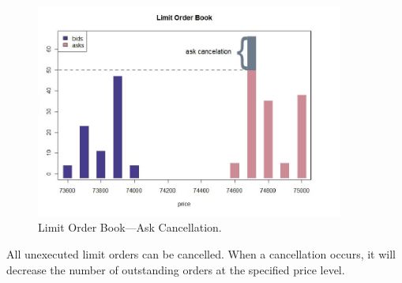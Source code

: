 	\begin{figure}[!ht]
	   \centering
	   \includegraphics[width=0.9\textwidth]{chapters/chapter_trading_fund/figures/limitbk3.png} 
	   \caption{Limit Order Book---Ask Cancellation. \label{fig:limbk3}}
	\end{figure}
All unexecuted limit orders can be cancelled. When a cancellation occurs, it will decrease the number of outstanding orders at the specified price level. \\



